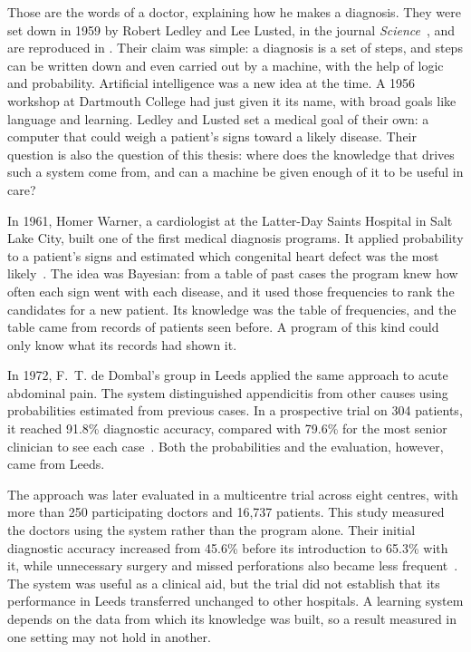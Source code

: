 \begin{reviewrewrite}
Those are the words of a doctor, explaining how he makes a diagnosis. They were set down in 1959 by Robert Ledley and Lee Lusted, in the journal \emph{Science}~\citep{ledley_lusted_1959}, and are reproduced in . Their claim was simple: a diagnosis is a set of steps, and steps can be written down and even carried out by a machine, with the help of logic and probability. Artificial intelligence was a new idea at the time. A 1956 workshop at Dartmouth College had just given it its name, with broad goals like language and learning. Ledley and Lusted set a medical goal of their own: a computer that could weigh a patient's signs toward a likely disease. Their question is also the question of this thesis: where does the knowledge that drives such a system come from, and can a machine be given enough of it to be useful in care?
\end{reviewrewrite}

\begin{reviewrewrite}
In 1961, Homer Warner, a cardiologist at the Latter-Day Saints Hospital in Salt Lake City, built one of the first medical diagnosis programs. It applied probability to a patient's signs and estimated which congenital heart defect was the most likely~\citep{warner_1961}. The idea was Bayesian: from a table of past cases the program knew how often each sign went with each disease, and it used those frequencies to rank the candidates for a new patient. Its knowledge was the table of frequencies, and the table came from records of patients seen before. A program of this kind could only know what its records had shown it.
\end{reviewrewrite}

\begin{reviewrewrite}
In 1972, F.~T. de Dombal's group in Leeds applied the same approach to acute
abdominal pain. The system distinguished appendicitis from other causes using
probabilities estimated from previous cases. In a prospective trial on 304
patients, it reached 91.8\% diagnostic accuracy, compared with 79.6\% for the
most senior clinician to see each case~\citep{dedombal_1972}. Both the
probabilities and the evaluation, however, came from Leeds.

The approach was later evaluated in a multicentre trial across eight centres,
with more than 250 participating doctors and 16{,}737 patients. This study
measured the doctors using the system rather than the program alone. Their
initial diagnostic accuracy increased from 45.6\% before its introduction to
65.3\% with it, while unnecessary surgery and missed perforations also became
less frequent~\citep{adams_1986}. The system was useful as a clinical aid, but
the trial did not establish that its performance in Leeds transferred unchanged
to other hospitals. A learning system depends on the data from which its
knowledge was built, so a result measured in one setting may not hold in another.
\end{reviewrewrite}

